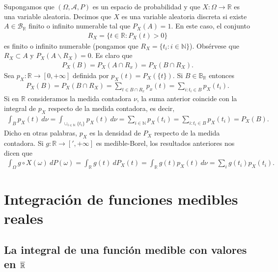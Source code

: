 \begin{ejemplo}
    Supongamos que $(\Omega, \mathcal{A}, P)$ es un espacio de probabilidad y que $X: \Omega \longrightarrow \mathbb{R}$ es una variable aleatoria. Decimos que $X$ es una variable aleatoria discreta si existe $A \in \mathcal{B}_{\mathbb{R}}$ finito o infinito numerable tal que $P_X(A) = 1$. En este caso, el conjunto
    \begin{align*}
        R_X = \{ t \in \mathbb{R} : P_X(t) > 0 \}
    \end{align*}
    es finito o infinito numerable (pongamos que $R_X = \{ t_i : i \in \mathbb{N}\}$). Obsérvese que $R_X \subset A$ y $P_X(A \backslash R_X) = 0$. Es claro que
    \begin{align*}
        P_X(B) = P_X(A \cap R_x) = P_X(B \cap R_X).
    \end{align*}
    Sea $p_X: \mathbb{R} \longrightarrow [0,+\infty]$ definida por $p_X(t) = P_X(\{t\})$. Si $B \in \mathbb{B}_{\mathbb{R}}$ entonces
    \begin{align*}
        P_X(B) = P_X(B \cap R_X) = \sum_{t \in B \cap R_x}{p_x(t)} = \sum_{i:t_i \in B}{p_X(t_i)}.
    \end{align*}
    Si en $\mathbb{R}$ consideramos la medida contadora $\nu$, la suma anterior coincide con la integral de $p_X$ respecto de la medida contadora, es decir,
    \begin{align*}
        \int_{B}{p_X(t) \ d\nu} = \int_{\cup_{i \in \mathbb{N}}{\{t_i\}}}{p_X(t) \ d\nu} = \sum_{i \in \mathbb{N}}{p_X(t_i)} = \sum_{i:t_i \in B}{p_X(t_i)} = P_X(B).
    \end{align*}
    Dicho en otras palabras, $p_X$ es la densidad de $P_X$ respecto de la medida contadora. Si $g: \mathbb{R} \longrightarrow [',+\infty]$ es medible-Borel, los resultados anteriores nos dicen que
    \begin{align*}
        \int_{\Omega}{g \circ X(\omega) \ dP(\omega)} = \int_{\mathbb{R}}{g(t) \ dP_X(t)} = \int_{\mathbb{R}}{g(t)p_X(t) \ d\nu} = \sum_{i}{g(t_i)p_X(t_i)}.
    \end{align*}
\end{ejemplo}

\section{Integración de funciones medibles reales}

\subsection{La integral de una función medible con valores en $\overline{\mathbb{R}}$}

